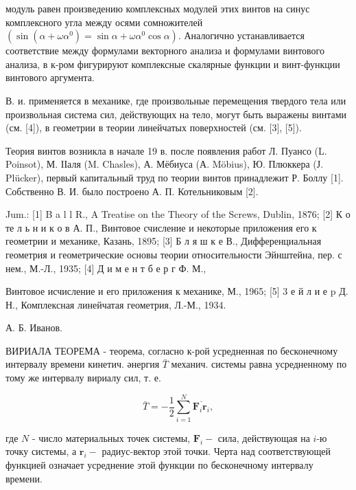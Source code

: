 \documentclass[10pt]{article}
\begin{document}
модуль равен произведению комплексных модулей этих винтов на синус комплексного угла между осями сомножителей $\left(\sin \left(\alpha+\omega \alpha^{0}\right)=\sin \alpha+\omega \alpha^{0} \cos \alpha\right)$. Аналогично устанавливается соответствие между формулами векторного анализа и формулами винтового анализа, в к-ром фигурируют комплексные скалярные функции и винт-функции винтового аргумента.



В. и. применяется в механике, где произвольные перемещения твердого тела или произвольная система сил, действующих на тело, могут быть выражены винтами (см. [4]), в геометрии в теории линейчатых поверхностей (см. [3], [5]).



Теория винтов возникла в начале 19 в. после появления работ Л. Пуансо (L. Poinsot), М. ІІаля (M. Chasles), А. Мёбиуса (А. Möbius), Ю. Плюккера (Ј. Plücker), первый капитальный труд по теории винтов принадлежит Р. Боллу [1]. Собственно В. И. было построено А. П. Котельниковым [2].



Jum.: [1] B a l l R., A Treatise on the Theory of the Screws, Dublin, 1876; [2] К о те л ь н и к о в А. П., Винтовое счисление и некоторые приложения его к геометрии и механике, Казань, 1895; [3] Б л я ш к е В., Дифференциальная геометрия и геометрические основы теории относительности Эйнштейна, пер. с нем., М.-Л., 1935; [4] Д и м е н т б е р г Ф. М.,

Винтовое исчисление и его приложения к механике, М., 1965; [5] 3 е й л и е p Д. Н., Комплексная линейчатая геометрия, Л.-М., 1934.



А. Б. Иванов.



ВИРИАЛА ТЕОРЕМА - теорема, согласно к-рой усредненная по бесконечному интервалу времени кинетич. әнергия $\bar{T}$ механич. системы равна усредненному по тому же интервалу вириалу сил, т. е.



\[

\bar{T}=-\frac{1}{2} \sum_{i=1}^{N} \overline{\boldsymbol{F}_{i} \boldsymbol{r}_{i}},

\]



где $N$ - число материальных точек системы, $\boldsymbol{F}_{i}-$ сила, действующая на $i$-ю точку системы, а $\boldsymbol{r}_{i}-$ радиус-вектор этой точки. Черта над соответствующей функцией означает усреднение этой функции по бесконечному интервалу времени.
\end{document}
